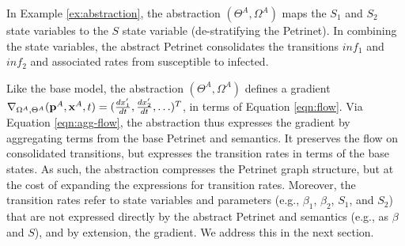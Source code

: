 In Example \ref{ex:abstraction}, the abstraction $(\Theta^{A}, \Omega^{A})$ maps the $S_1$ and $S_2$ state variables to the $S$ state variable (de-stratifying the Petrinet).  In combining the state variables, the abstract Petrinet consolidates the transitions $inf_1$ and $inf_2$ and associated rates from susceptible to infected.  

Like the base model, the abstraction $(\Theta^{A}, \Omega^{A})$ defines a gradient $\nabla_{\Omega^{A}, \Theta^{A}}({\bf p}^{A}, {\bf x}^{A}, t) = (\frac{dx_1'}{dt},
\frac{dx_2'}{dt}, \ldots)^T$, in terms of Equation \ref{eqn:flow}.
Via Equation \ref{eqn:agg-flow}, the abstraction thus expresses the gradient by aggregating terms from the
base Petrinet and semantics.  It preserves the flow on consolidated transitions, but
expresses the transition rates in terms of the base states.  As such, the
abstraction compresses the Petrinet graph structure, but at the cost of
expanding the expressions for transition rates. Moreover, the transition
rates refer to state variables and parameters (e.g., $\beta_1$, $\beta_2$, $S_1$, and $S_2$) that are not expressed
directly by the abstract Petrinet and semantics (e.g., as $\beta$ and $S$), and by extension, the gradient. We address this in the next section.

